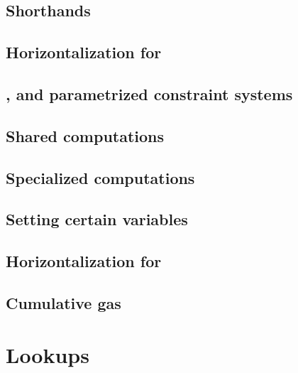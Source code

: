 \subsection{Shorthands}                                                     \label{user txn data: constraints: shorthands}                     
\subsection{Horizontalization for \rlpTxnMod{}}                             \label{user txn data: constraints: horizontalization rlpTxn}       
\subsection{\wcpFlag{}, \eucFlag{} and parametrized constraint systems}     \label{user txn data: constraints: comparison constraints}         
\subsection{Shared computations}                                            \label{user txn data: constraints: common computations}            
\subsection{Specialized computations}                                       \label{user txn data: constraints: specialized computations}       
\subsection{Setting certain variables}                                      \label{user txn data: constraints: setting variables}              
\subsection{Horizontalization for \rlpTxnRcptMod{}}                         \label{user txn data: constraints: horizontalization rlpTxnRcpt}   
\subsection{Cumulative gas}                                                 \label{user txn data: constraints: cumulative gas}                 

\section{Lookups}                                                           \label{user txn data: lookups}                                     
